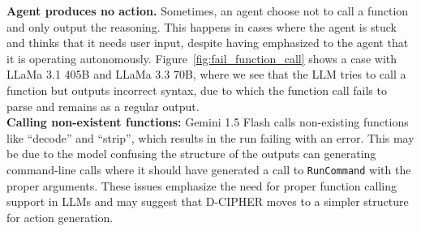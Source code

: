 \noindent
\textbf{Agent produces no action.} 
Sometimes, an agent choose not to call a function and only output the reasoning.
This happens in cases where the agent is stuck and thinks that it needs user input,
despite having emphasized to the agent that it is operating autonomously.
Figure~\ref{fig:fail_function_call} shows a case with LLaMa 3.1 405B and LLaMa 3.3 70B, where we see that the LLM tries to call a function but outputs incorrect syntax, due to which the function call fails to parse and remains as a regular output.
\\



\noindent
\textbf{Calling non-existent functions:}
Gemini 1.5 Flash calls non-existing functions like  ``decode'' and ``strip'', which results in the run failing with an error. This may be due to the model confusing the structure of the outputs can generating command-line calls where it should have generated a call to \texttt{RunCommand} with the proper arguments. 
These issues emphasize the need for proper function calling support in LLMs and may suggest that D-CIPHER moves to a simpler structure for action generation.
\\



